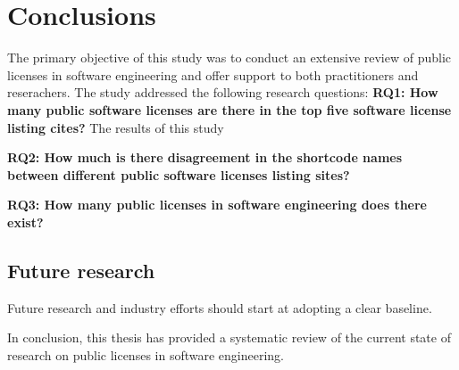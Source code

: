 \chapter{Conclusions\label{conclusions}}
The primary objective of this study was to conduct an extensive review of public licenses in software engineering and offer support to both practitioners and reserachers. The study addressed the following research questions:
\textbf{RQ1: How many public software licenses are there in the top five software license listing cites?} The results of this study

\textbf{RQ2: How much is there disagreement in the shortcode names between different public software licenses listing sites?}

\textbf{RQ3: How many public licenses in software engineering does there exist?}



\section{Future research}
Future research and industry efforts should start at adopting a clear baseline. 






In conclusion, this thesis has provided a systematic review of the current state of research on public licenses in software engineering.